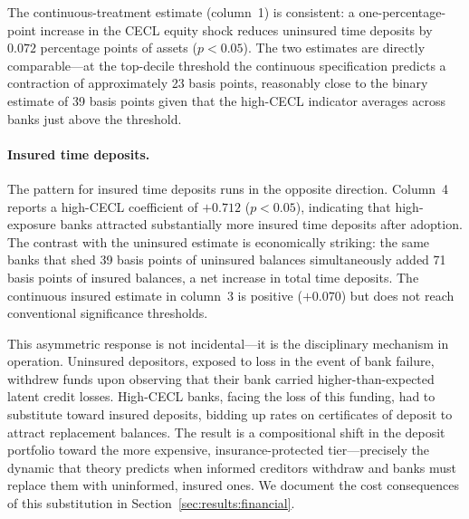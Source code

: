 The continuous-treatment estimate (column~1) is consistent: a one-percentage-point
increase in the CECL equity shock reduces uninsured time deposits by $0.072$
percentage points of assets ($p < 0.05$). The two estimates are directly
comparable---at the top-decile threshold the continuous specification predicts a
contraction of approximately 23 basis points, reasonably close to the binary
estimate of 39 basis points given that the high-CECL indicator averages across
banks just above the threshold.

\paragraph{Insured time deposits.}
The pattern for insured time deposits runs in the opposite direction. Column~4
reports a high-CECL coefficient of $+0.712$ ($p < 0.05$), indicating that
high-exposure banks attracted substantially more insured time deposits after
adoption. The contrast with the uninsured estimate is economically striking: the
same banks that shed 39 basis points of uninsured balances simultaneously added
71 basis points of insured balances, a net increase in total time deposits. The
continuous insured estimate in column~3 is positive ($+0.070$) but does not
reach conventional significance thresholds.

This asymmetric response is not incidental---it is the disciplinary mechanism in
operation. Uninsured depositors, exposed to loss in the event of bank failure,
withdrew funds upon observing that their bank carried higher-than-expected latent
credit losses. High-CECL banks, facing the loss of this funding, had to
substitute toward insured deposits, bidding up rates on certificates of deposit
to attract replacement balances. The result is a compositional shift in the
deposit portfolio toward the more expensive, insurance-protected tier---precisely
the dynamic that theory predicts when informed creditors withdraw and banks must
replace them with uninformed, insured ones. We document the cost consequences
of this substitution in Section~\ref{sec:results:financial}.

